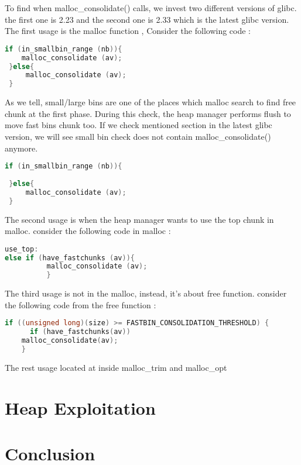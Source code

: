 \documentclass{masterthesis}
\newcommand*\libc{glibc}
\newcommand*\fb{fast bins}
\begin{document}
To find when malloc\_consolidate() calls, we invest two different versions of \libc{}. the first one is 2.23 and the second one is 2.33 which is the latest \libc{} version. The first usage is the malloc function , Consider the following code :
\begin{lstlisting}[language=c]
 if (in_smallbin_range (nb)){
 	malloc_consolidate (av);
 }else{
	 malloc_consolidate (av);
 }
\end{lstlisting}
As we tell, small/large bins are one of the places which malloc search to find free chunk at the first phase. During this check, the heap manager performs flush to move \fb{} chunk too. If we check mentioned section in the latest \libc{} version, we will see small bin check does not contain malloc\_consolidate() anymore.
\begin{lstlisting}[language=c]
 if (in_smallbin_range (nb)){
 	 
 }else{
	 malloc_consolidate (av);
 }
\end{lstlisting}

The second usage is when the heap manager wants to use the top chunk in malloc. consider the following code in malloc :
\begin{lstlisting}[language=c]
use_top:
else if (have_fastchunks (av)){
          malloc_consolidate (av);
          }
\end{lstlisting}

The third usage is not in the malloc, instead, it's about free function. consider the following code from the free function :
\begin{lstlisting}[language=c]
if ((unsigned long)(size) >= FASTBIN_CONSOLIDATION_THRESHOLD) {
      if (have_fastchunks(av))
	malloc_consolidate(av);
	}
\end{lstlisting}

The rest usage located at inside malloc\_trim and malloc\_opt

\chapter{Heap Exploitation }

\chapter{Conclusion}



\end{document}
